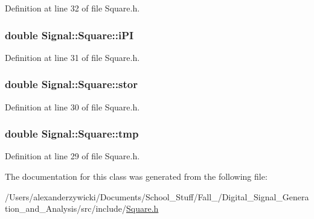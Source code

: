 Definition at line 32 of file Square.\+h.

\hypertarget{classSignal_1_1Square_a9c43074c487301290c48ddf736010cdf}{
\subsubsection[{i\+P\+I}]{\setlength{\rightskip}{0pt plus 5cm}double Signal\+::\+Square\+::i\+P\+I\hspace{0.3cm}{\ttfamily [protected]}}}\label{classSignal_1_1Square_a9c43074c487301290c48ddf736010cdf}


Definition at line 31 of file Square.\+h.

\hypertarget{classSignal_1_1Square_ae63c68380aa8e98f1bca6acdf56bb1c0}{
\subsubsection[{stor}]{\setlength{\rightskip}{0pt plus 5cm}double Signal\+::\+Square\+::stor\hspace{0.3cm}{\ttfamily [protected]}}}\label{classSignal_1_1Square_ae63c68380aa8e98f1bca6acdf56bb1c0}


Definition at line 30 of file Square.\+h.

\hypertarget{classSignal_1_1Square_ac910bb3a32660a3f0e2bd85df7afd9c0}{
\subsubsection[{tmp}]{\setlength{\rightskip}{0pt plus 5cm}double Signal\+::\+Square\+::tmp\hspace{0.3cm}{\ttfamily [protected]}}}\label{classSignal_1_1Square_ac910bb3a32660a3f0e2bd85df7afd9c0}


Definition at line 29 of file Square.\+h.



The documentation for this class was generated from the following file\+:\begin{DoxyCompactItemize}
\item 
/\+Users/alexanderzywicki/\+Documents/\+School\+\_\+\+Stuff/\+Fall\+\_/\+Digital\+\_\+\+Signal\+\_\+\+Generation\+\_\+and\+\_\+\+Analysis/src/include/\hyperlink{Square_8h}{Square.\+h}\end{DoxyCompactItemize}
